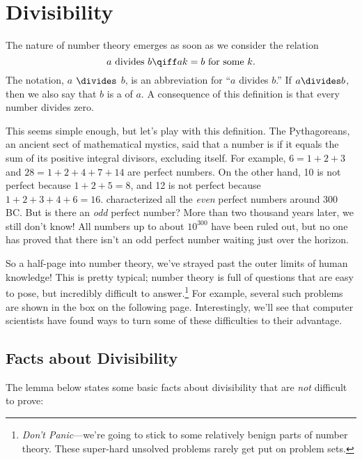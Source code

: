 \section{Divisibility}\label{divisibility_sec}

The nature of number theory emerges as soon as we consider the
 relation
\[
a \text{ divides } b \qiff ak = b \text{ for some } k.
\]
The notation, $a$ $\divides$ $b$,
is an abbreviation for ``$a$ divides $b$.''  If $a \divides b$, then
we also say that $b$ is a  of $a$.  A consequence of
this definition is that every number divides zero.

This seems simple enough, but let's play with this definition.  The
Pythagoreans, an ancient sect of mathematical mystics, said that a number
is  if it equals the sum of its
positive integral divisors, excluding itself.  For example, $6 = 1 + 2 +
3$ and $28 = 1 + 2 + 4 + 7 + 14$ are perfect numbers.  On the other hand,
10 is not perfect because $1 + 2 + 5 = 8$, and 12 is not perfect because
$1 + 2 + 3 + 4 + 6 = 16$.   characterized all the \emph{even}
perfect numbers around 300 BC.  But is there an \emph{odd} perfect number?
More than two thousand years later, we still don't know!  All numbers up
to about $10^{300}$ have been ruled out, but no one has proved that there
isn't an odd perfect number waiting just over the horizon.

So a half-page into number theory, we've strayed past the outer limits
of human knowledge!  This is pretty typical; number theory is full of
questions that are easy to pose, but incredibly difficult to
answer.\footnote{\emph{Don't Panic}---we're going to stick to some
relatively benign parts of number theory.  These super-hard unsolved
problems rarely get put on problem sets.}  For example, several such
problems are shown in the box on the following page.
Interestingly, we'll see that computer scientists have found ways to
turn some of these difficulties to their advantage.

\subsection{Facts about Divisibility}

The lemma below states some basic facts about divisibility that are
\emph{not} difficult to prove:

